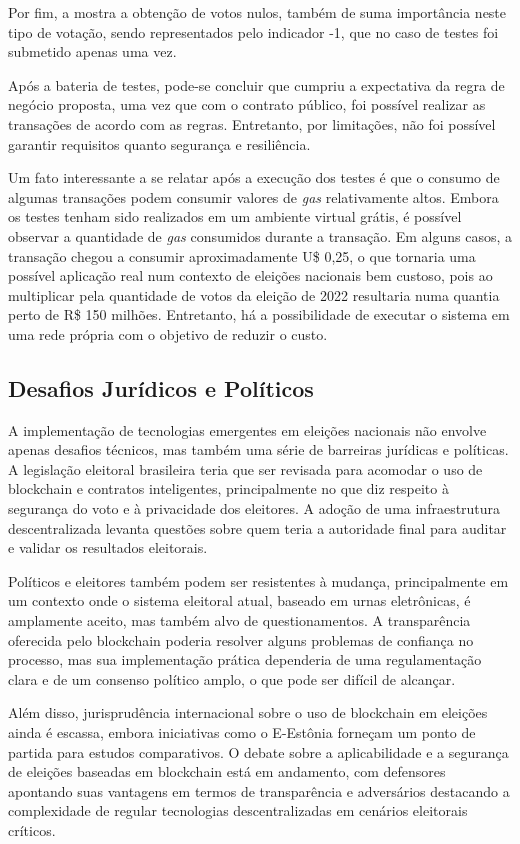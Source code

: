 \documentclass[portuguese]{textolivre}
\begin{document}
	Por fim, a  mostra a obtenção de votos nulos, também de suma importância neste tipo de votação, sendo representados pelo indicador -1, que no caso de testes foi submetido apenas uma vez. 
	
	Após a bateria de testes, pode-se concluir que cumpriu a expectativa da regra de negócio proposta, uma vez que com o contrato público, foi possível realizar as transações de acordo com as regras. Entretanto,  por limitações, não foi possível garantir requisitos quanto segurança e resiliência.
	
	Um fato interessante a se relatar após a execução dos testes é que o consumo de algumas transações podem consumir valores de \textit{gas} relativamente altos. Embora os testes tenham sido realizados em um ambiente virtual grátis, é possível observar a quantidade de \textit{gas} consumidos durante a transação. Em alguns casos, a transação chegou a consumir aproximadamente U\$ 0,25, o que tornaria uma possível aplicação real num contexto de eleições nacionais bem custoso, pois ao multiplicar pela quantidade de votos da eleição de 2022 resultaria numa quantia perto de R\$ 150 milhões. Entretanto, há a possibilidade de executar o sistema em uma rede própria com o objetivo de reduzir o custo.
	
	
	\subsection{Desafios Jurídicos e Políticos}
	A implementação de tecnologias emergentes em eleições nacionais não envolve apenas desafios técnicos, mas também uma série de barreiras jurídicas e políticas. A legislação eleitoral brasileira teria que ser revisada para acomodar o uso de blockchain e contratos inteligentes, principalmente no que diz respeito à segurança do voto e à privacidade dos eleitores. A adoção de uma infraestrutura descentralizada levanta questões sobre quem teria a autoridade final para auditar e validar os resultados eleitorais.
	
	Políticos e eleitores também podem ser resistentes à mudança, principalmente em um contexto onde o sistema eleitoral atual, baseado em urnas eletrônicas, é amplamente aceito, mas também alvo de questionamentos. A transparência oferecida pelo blockchain poderia resolver alguns problemas de confiança no processo, mas sua implementação prática dependeria de uma regulamentação clara e de um consenso político amplo, o que pode ser difícil de alcançar.
	
	Além disso, jurisprudência internacional sobre o uso de blockchain em eleições ainda é escassa, embora iniciativas como o E-Estônia forneçam um ponto de partida para estudos comparativos. O debate sobre a aplicabilidade e a segurança de eleições baseadas em blockchain está em andamento, com defensores apontando suas vantagens em termos de transparência e adversários destacando a complexidade de regular tecnologias descentralizadas em cenários eleitorais críticos.
\end{document}
